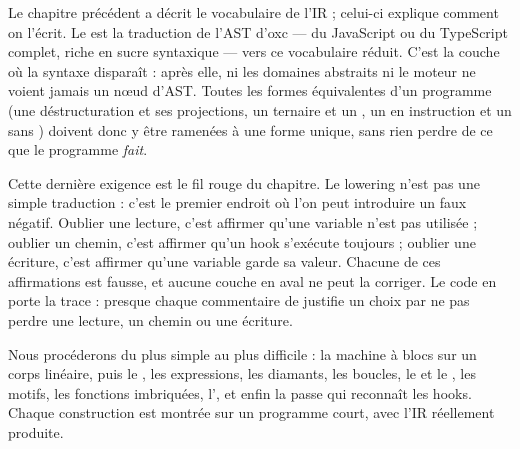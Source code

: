 
Le chapitre précédent a décrit le vocabulaire de l'IR ; celui-ci explique comment on l'écrit. Le  est la traduction de l'AST d'oxc --- du JavaScript ou du TypeScript complet, riche en sucre syntaxique --- vers ce vocabulaire réduit. C'est la couche où la syntaxe disparaît : après elle, ni les domaines abstraits ni le moteur ne voient jamais un nœud d'AST. Toutes les formes équivalentes d'un programme (une déstructuration et ses projections, un ternaire et un , un \code{&&} en instruction et un  sans ) doivent donc y être ramenées à une forme unique, sans rien perdre de ce que le programme \emph{fait}.

Cette dernière exigence est le fil rouge du chapitre. Le lowering n'est pas une simple traduction : c'est le premier endroit où l'on peut introduire un faux négatif. Oublier une lecture, c'est affirmer qu'une variable n'est pas utilisée ; oublier un chemin, c'est affirmer qu'un hook s'exécute toujours ; oublier une écriture, c'est affirmer qu'une variable garde sa valeur. Chacune de ces affirmations est fausse, et aucune couche en aval ne peut la corriger. Le code en porte la trace : presque chaque commentaire de  justifie un choix par \og ne pas perdre une lecture, un chemin ou une écriture\fg{}.

Nous procéderons du plus simple au plus difficile : la machine à blocs sur un corps linéaire, puis le , les expressions, les diamants, les boucles, le  et le , les motifs, les fonctions imbriquées, l', et enfin la passe qui reconnaît les hooks. Chaque construction est montrée sur un programme court, avec l'IR réellement produite.

